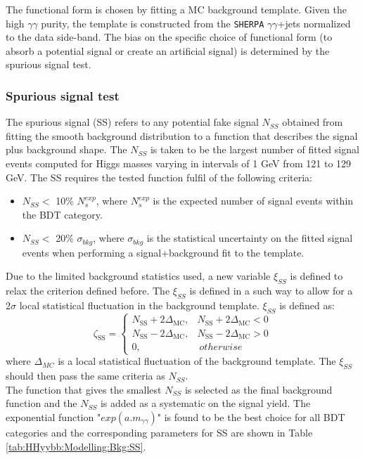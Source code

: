 The functional form is chosen by fitting a MC background template. Given the high $\gamma\gamma$ purity, the template is constructed from the \texttt{SHERPA} $\gamma\gamma$+jets normalized to the data side-band. The bias on the specific choice of functional form (to absorb a potential signal or create an artificial signal) is determined by the spurious signal test. 

\subsubsection{Spurious signal test}
\label{HHyybb:Modelling:Bkg:SS}
The spurious signal (SS) refers to any potential fake signal $N_{SS}$ obtained from fitting the smooth background distribution to a function that describes the signal plus background shape. The $N_{SS}$ is taken to be the largest number of fitted signal events computed for Higgs masses varying in intervals of 1 GeV from 121 to 129 GeV. The SS requires the tested function fulfil of the following criteria: 
\begin{itemize}
    \item $N_{SS} < $ 10\% $N_{s}^{exp}$, where $N_{s}^{exp}$ is the expected number of signal events within the BDT category. 
    \item $N_{SS} < $ 20\% $\sigma_{bkg}$, where $\sigma_{bkg}$ is the statistical uncertainty on the fitted signal events when performing a signal+background fit to the template. 
\end{itemize}

Due to the limited background statistics used, a new variable $\xi_{SS}$ is defined to relax the criterion defined before. The $\xi_{SS}$ is defined in a such way to allow for a 2$\sigma$ local statistical fluctuation in the background template. $\xi_{SS}$ is defined as: 
\begin{equation}
    \zeta_{\mathrm{SS}}=\left\{\begin{array}{ll}
N_{\mathrm{SS}}+2 \Delta_{\mathrm{MC}}, & N_{\mathrm{SS}}+2 \Delta_{\mathrm{MC}}<0 \\
N_{\mathrm{SS}}-2 \Delta_{\mathrm{MC}}, & N_{\mathrm{SS}}-2 \Delta_{\mathrm{MC}}>0 \\
0, & \  otherwise 
\end{array}\right.
\end{equation}
where $\Delta_{MC}$ is a local statistical fluctuation of the background template. The $\xi_{SS}$ should then pass the same criteria as $N_{SS}$. \\
The function that gives the smallest $N_{SS}$ is selected as the final background function and the $N_{SS}$ is added as a systematic on the signal yield. The exponential function "$exp(a.m_{\gamma\gamma})$" is found to be the best choice for all BDT categories and the corresponding parameters for SS are shown in Table \ref{tab:HHyybb:Modelling:Bkg:SS}.

